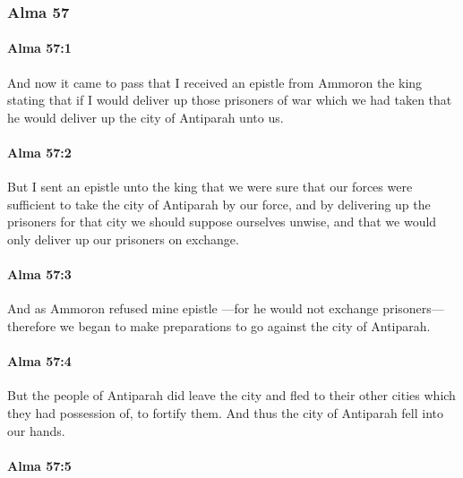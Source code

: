 	\subsubsection{Alma 57} %
		\label{ALMA-57}
		
		\paragraph{Alma 57:1} %
			\label{ALMA-57-1}

			And now it came to pass that I received an epistle from Ammoron the king
			stating that if I would deliver up those prisoners of war which we had taken
			that he would deliver up the city of Antiparah unto us.

		\paragraph{Alma 57:2} %
			\label{ALMA-57-2}

			But I sent an epistle unto the king that we were sure
			that our forces were sufficient to take the city of Antiparah by our force,
			and by delivering up the prisoners for that city
			we should suppose ourselves unwise,
			and that we would only deliver up our prisoners on exchange.

		\paragraph{Alma 57:3} %
			\label{ALMA-57-3}

			And as Ammoron refused mine epistle
			---for he would not exchange prisoners---
			therefore we began to make preparations to go against the city of Antiparah.

		\paragraph{Alma 57:4} %
			\label{ALMA-57-4}

			But the people of Antiparah did leave the city
			and fled to their other cities which they had possession of, to fortify them.
			And thus the city of Antiparah fell into our hands.

		\paragraph{Alma 57:5} %
			\label{ALMA-57-5}

